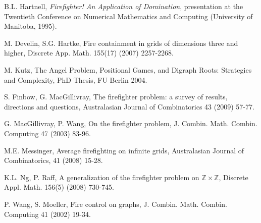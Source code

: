 \documentclass[12pt]{article}
\begin{document}
\begin{thebibliography}{99}
 B.L. Hartnell, \emph{Firefighter! An Application of Domination}, presentation at the Twentieth Conference on Numerical Mathematics and Computing (University of Manitoba, 1995).

 M. Develin, S.G. Hartke, Fire containment in grids of dimensions three and higher, Discrete App. Math. 155(17) (2007) 2257-2268.

 M. Kutz, The Angel Problem, Positional Games, and Digraph Roots: Strategies and Complexity, PhD Thesis, FU Berlin 2004.  

 S. Finbow, G. MacGillivray, The firefighter problem: a survey of results, directions and questions, Australasian Journal of Combinatorics 43 (2009) 57-77.

 G. MacGillivray, P. Wang, On the firefighter problem, J. Combin. Math. Combin. Computing 47 (2003) 83-96.


 M.E. Messinger,  Average firefighting on infinite grids, Australasian Journal of Combinatorics, 41 (2008) 15-28.

 K.L. Ng, P. Raff, A generalization of the firefighter problem on $\mathbb{Z} \times \mathbb{Z}$, Discrete Appl. Math. 156(5) (2008) 730-745.

 P. Wang, S. Moeller, Fire control on graphs, J. Combin. Math. Combin. Computing 41 (2002) 19-34.











\end{thebibliography}
\end{document}
